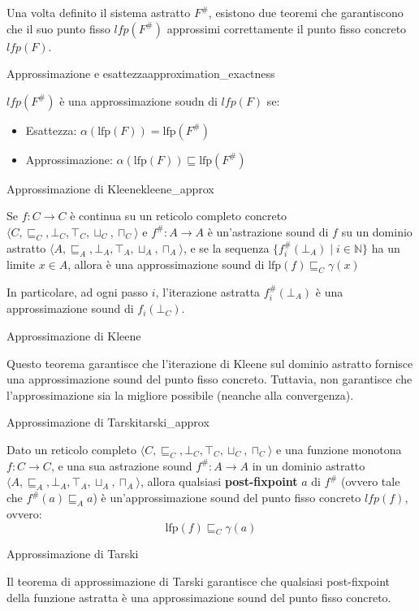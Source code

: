 Una volta definito il sistema astratto $F^\#$, esistono due teoremi che
garantiscono che il suo punto fisso $lfp(F^\#)$ approssimi correttamente il punto
fisso concreto $lfp(F)$.

\begin{nota}{Approssimazione e esattezza}{approximation_exactness}

$lfp(F^\#)$ è una approssimazione soudn di $lfp(F)$ se:
\begin{itemize}
    \item Esattezza: $\alpha(\text{lfp}(F)) = \text{lfp}(F^\#)$
    \item Approssimazione: $\alpha(\text{lfp}(F)) \sqsubseteq \text{lfp}(F^\#)$
\end{itemize}

\end{nota}

\begin{teorema}{Approssimazione di Kleene}{kleene_approx}

Se $f: C \to C$ è continua su un reticolo completo concreto $\langle C, \sqsubseteq_C, \bot_C, \top_C, \sqcup_C, \sqcap_C \rangle$
e $f^\#: A \to A$ è un'astrazione sound di $f$ su un dominio astratto
$\langle A, \sqsubseteq_A, \bot_A, \top_A, \sqcup_A, \sqcap_A \rangle$, e se
la sequenza $\{f^\#_i(\bot_A) \mid i \in \mathbb{N} \}$ ha un limite $x \in A$,
allora è una approssimazione sound di $\text{lfp}(f) \sqsubseteq_C \gamma(x)$

In particolare, ad ogni passo $i$, l'iterazione astratta $f^\#_i(\bot_A)$
è una approssimazione sound di $f_i(\bot_C)$.

\end{teorema}


\begin{nota}{Approssimazione di Kleene}{}

Questo teorema garantisce che l'iterazione di Kleene sul dominio astratto
fornisce una approssimazione sound del punto fisso concreto.
Tuttavia, non garantisce che l'approssimazione sia la migliore possibile
(neanche alla convergenza).

\end{nota}

\begin{teorema}{Approssimazione di Tarski}{tarski_approx}

Dato un reticolo completo $\langle C, \sqsubseteq_C, \bot_C, \top_C, \sqcup_C, \sqcap_C \rangle$
e una funzione monotona $f: C \to C$, e una sua astrazione sound $f^\#: A \to A$
in un dominio astratto $\langle A, \sqsubseteq_A, \bot_A, \top_A, \sqcup_A, \sqcap_A \rangle$,
allora qualsiasi \textbf{post-fixpoint} $a$ di $f^\#$ (ovvero tale che $f^\#(a) \sqsubseteq_A a$)
è un'approssimazione sound del punto fisso concreto $lfp(f)$, ovvero:
\[ \text{lfp}(f) \sqsubseteq_C \gamma(a) \]

\end{teorema}
\begin{nota}{Approssimazione di Tarski}{}

Il teorema di approssimazione di Tarski garantisce che qualsiasi
post-fixpoint della funzione astratta è una approssimazione sound del
punto fisso concreto.

\end{nota}
